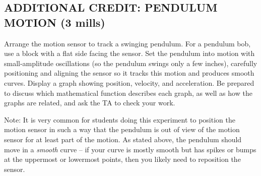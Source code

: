 \subsection*{ADDITIONAL CREDIT: PENDULUM MOTION (3 mills)}

Arrange the motion sensor to track a swinging pendulum.  For a pendulum bob,
use a block with a flat side facing the sensor.  Set the pendulum into motion
with small-amplitude oscillations (so the pendulum swings only a few inches), 
carefully positioning and aligning the sensor so it tracks this motion and produces smooth curves.  
Display a graph showing position, velocity, and acceleration.  Be prepared to discuss which mathematical function describes each graph, as well as how the graphs are related, and ask the TA to check your work.

Note:  It is very common for students doing this experiment to position the
motion sensor in such a way that the pendulum is out of view of the motion
sensor for at least part of the motion.  
As stated above, the pendulum should move in a \emph{smooth} curve -- 
if your curve is mostly smooth but has spikes or bumps at the uppermost or
lowermost points, then you likely need to reposition the sensor.

